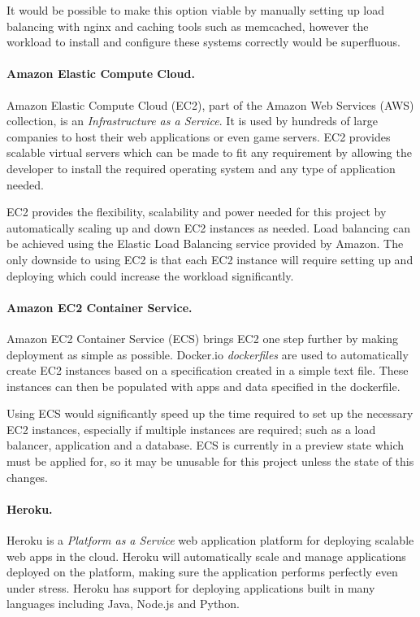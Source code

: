 \documentclass[a4paper, 12pt]{article}
\begin{document}
It would be possible to make this option viable by manually setting up load balancing with nginx and caching tools such as memcached, however the workload to install and configure these systems correctly would be superfluous.\cite{nginxloadbalancing,memcached}

\paragraph{Amazon Elastic Compute Cloud.}
Amazon Elastic Compute Cloud (EC2), part of the Amazon Web Services (AWS) collection, is an \emph{Infrastructure as a Service}.\cite{awsec2} It is used by hundreds of large companies to host their web applications or even game servers. EC2 provides scalable virtual servers which can be made to fit any requirement by allowing the developer to install the required operating system and any type of application needed.

EC2 provides the flexibility, scalability and power needed for this project by automatically scaling up and down EC2 instances as needed.\cite{awsec2} Load balancing can be achieved using the Elastic Load Balancing service provided by Amazon.\cite{elasticloadbalancing} The only downside to using EC2 is that each EC2 instance will require setting up and deploying which could increase the workload significantly.

\paragraph{Amazon EC2 Container Service.}
Amazon EC2 Container Service (ECS) brings EC2 one step further by making deployment as simple as possible. Docker.io \emph{dockerfiles} are used to automatically create EC2 instances based on a specification created in a simple text file.\cite{awsecs} These instances can then be populated with apps and data specified in the dockerfile.\cite{dockerfile}

Using ECS would significantly speed up the time required to set up the necessary EC2 instances, especially if multiple instances are required; such as a load balancer, application and a database. ECS is currently in a preview state which must be applied for, so it may be unusable for this project unless the state of this changes.

\paragraph{Heroku.}
Heroku is a \emph{Platform as a Service} web application platform for deploying scalable web apps in the cloud. Heroku will automatically scale and manage applications deployed on the platform, making sure the application performs perfectly even under stress.\cite{heroku} Heroku has support for deploying applications built in many languages including Java, Node.js and Python.
\end{document}
